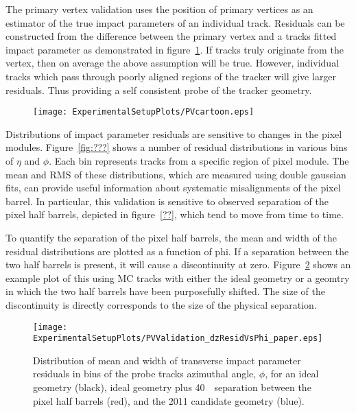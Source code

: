 

The primary vertex validation uses the position of primary vertices as
an estimator of the true impact parameters of an individual track.  
Residuals can be constructed from the difference between the primary 
vertex and a tracks fitted impact parameter as demonstrated in 
figure~\ref{fig:PVcartoon}.    If tracks truly originate from 
the vertex, then on average the above assumption
will be true.  However, individual tracks which pass through poorly 
aligned regions of the tracker will give larger residuals.  Thus providing
a self consistent probe of the tracker geometry.  

\begin{figure}
\begin{center}
\texttt{[image: ExperimentalSetupPlots/PVcartoon.eps]}
\caption{}
\label{fig:PVcartoon}
\end{center}
\end{figure}

Distributions of impact parameter residuals are sensitive to changes in the
pixel modules.
Figure~\ref{fig:???}
shows a number of residual distributions in various bins of $\eta$ and
$\phi$.  Each bin represents tracks from a specific region of pixel 
module.  The mean and RMS of these distributions, which are measured
using double gaussian fits, can provide useful
information about systematic misalignments of the pixel barrel.  In
particular, this validation is sensitive to observed separation of the
pixel half barrels, depicted in figure~\ref{??}, which tend to move from 
time to time. 

To quantify the separation of the pixel half barrels, the mean and width
of the residual distributions are plotted as a function of phi.  If a 
separation between the two half barrels is present, it will cause a discontinuity
at zero.  Figure~\ref{fig:dzResidVsPhi} shows an example plot of this
using MC tracks with either the ideal geometry or a geomtry in which the 
two half barrels have been purposefully shifted.  The size of the
discontinuity is directly corresponds to the size of the physical separation.  

\begin{figure}
\begin{center}
\texttt{[image: ExperimentalSetupPlots/PVValidation\_dzResidVsPhi\_paper.eps]}
\caption{Distribution of mean and width of transverse impact parameter residuals 
in bins of the probe tracks azimuthal angle, $\phi$, for an ideal geometry (black), 
ideal geometry plus 40~\microns~separation between the pixel half barrels (red),
and the 2011 candidate geometry (blue).}
\label{fig:dzResidVsPhi}
\end{center}
\end{figure}

